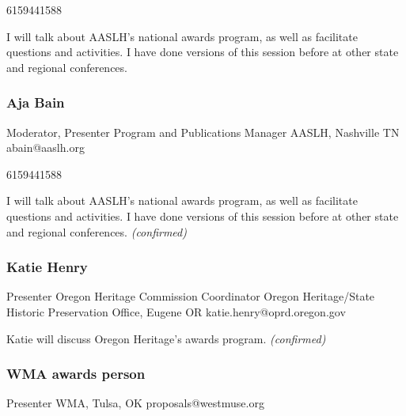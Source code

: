 \documentclass{report}
\begin{document}
              6159441588\newline

              I will talk about AASLH's national awards program, as well as facilitate questions and activities. I have done versions of this session before at other state and regional conferences.\newline


              
                \subsubsection*{ Aja Bain }
                Moderator, Presenter\newline
                Program and Publications Manager\newline
                AASLH, Nashville TN
                \newline
                abain@aaslh.org\newline
                
                6159441588\newline

                I will talk about AASLH's national awards program, as well as facilitate questions and activities. I have done versions of this session before at other state and regional conferences.\newline
                \emph{ (confirmed) }
              

              
                \subsubsection*{ Katie Henry }
                Presenter\newline
                Oregon Heritage Commission Coordinator\newline
                Oregon Heritage/State Historic Preservation Office, Eugene OR
                \newline
                katie.henry@oprd.oregon.gov\newline
                
                

                Katie will discuss Oregon Heritage's awards program.
                \emph{ (confirmed) }
              

              
                \subsubsection*{ WMA awards person }
                Presenter\newline
                \newline
                WMA, Tulsa, OK
                \newline
                proposals@westmuse.org\newline
                
\end{document}
